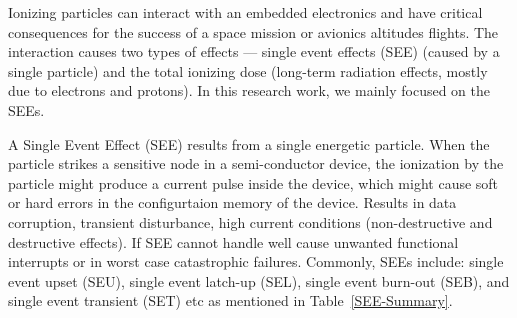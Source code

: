 Ionizing particles can interact with an embedded electronics and have critical consequences for the success of a space mission or avionics altitudes flights. The interaction causes two types of effects ---
single event effects (SEE) (caused by a single particle) and the total ionizing dose (long-term radiation effects, mostly due to electrons and protons). In this research work, we mainly focused on the SEEs.


A Single Event Effect (SEE) results from a single energetic particle. When the particle strikes a sensitive node in a semi-conductor device, the ionization by the particle might produce a current pulse inside the device, which might cause soft or hard errors in the configurtaion memory of the device. Results in data corruption, transient disturbance, high current conditions (non-destructive and destructive
effects). If SEE cannot handle well cause unwanted functional interrupts or in worst case catastrophic failures. Commonly, SEEs include: single event upset (SEU), single event latch-up (SEL), single event burn-out (SEB), and single event transient (SET) etc as mentioned in Table~\ref{SEE-Summary}. 


